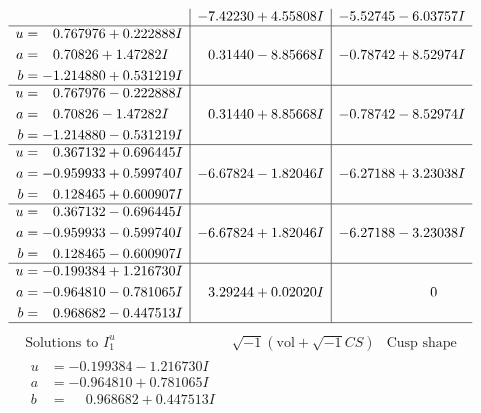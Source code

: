 \documentclass[1p]{elsarticle_modified}
\theoremstyle{definition}
\newcommand{\I}{\sqrt{-1}}
\begin{document}
$$\begin{array}{c|c|c}
 & -7.42230 + 4.55808 I & -5.52745 - 6.03757 I \\ \hline\begin{aligned}
u &= \phantom{-}0.767976 + 0.222888 I \\
a &= \phantom{-}0.70826 + 1.47282 I \\
b &= -1.214880 + 0.531219 I\end{aligned}
 & \phantom{-}0.31440 - 8.85668 I & -0.78742 + 8.52974 I \\ \hline\begin{aligned}
u &= \phantom{-}0.767976 - 0.222888 I \\
a &= \phantom{-}0.70826 - 1.47282 I \\
b &= -1.214880 - 0.531219 I\end{aligned}
 & \phantom{-}0.31440 + 8.85668 I & -0.78742 - 8.52974 I \\ \hline\begin{aligned}
u &= \phantom{-}0.367132 + 0.696445 I \\
a &= -0.959933 + 0.599740 I \\
b &= \phantom{-}0.128465 + 0.600907 I\end{aligned}
 & -6.67824 - 1.82046 I & -6.27188 + 3.23038 I \\ \hline\begin{aligned}
u &= \phantom{-}0.367132 - 0.696445 I \\
a &= -0.959933 - 0.599740 I \\
b &= \phantom{-}0.128465 - 0.600907 I\end{aligned}
 & -6.67824 + 1.82046 I & -6.27188 - 3.23038 I \\ \hline\begin{aligned}
u &= -0.199384 + 1.216730 I \\
a &= -0.964810 - 0.781065 I \\
b &= \phantom{-}0.968682 - 0.447513 I\end{aligned}
 & \phantom{-}3.29244 + 0.02020 I & \phantom{-0.000000 } 0\\
 \hline 
 \end{array}$$\newpage$$\begin{array}{c|c|c}  
\text{Solutions to }I^u_{1}& \I (\text{vol} + \sqrt{-1}CS) & \text{Cusp shape}\\
 \hline 
\begin{aligned}
u &= -0.199384 - 1.216730 I \\
a &= -0.964810 + 0.781065 I \\
b &= \phantom{-}0.968682 + 0.447513 I\end{aligned}

\end{array}$$
\end{document}
